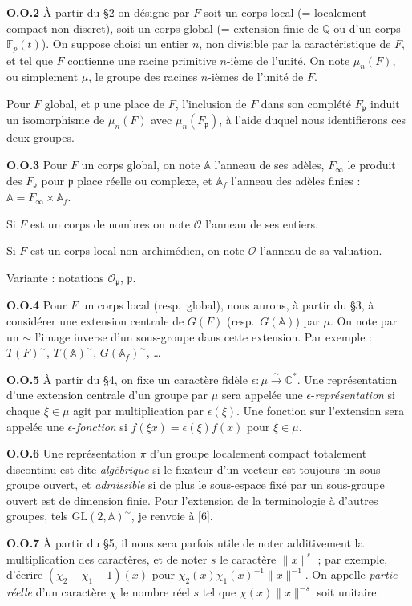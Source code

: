 \documentclass[12pt,a4paper]{article}
\theoremstyle{plain}
\theoremstyle{definition}
\theoremstyle{remark}
\newcommand{\CC}{\mathbb{C}}
\newcommand{\QQ}{\mathbb{Q}}
\newcommand{\Af}{\mathbb{A}}
\newcommand{\FF}{\mathbb{F}}
\newcommand{\cO}{\mathcal{O}}
\newcommand{\frakp}{\mathfrak{p}}
\providecommand{\CC}{\mathbb{C}}
\providecommand{\FF}{\mathbb{F}}
\providecommand{\QQ}{\mathbb{Q}}
\providecommand{\cO}{\mathcal{O}}
\providecommand{\frakp}{\mathfrak{p}}
\begin{document}
\textbf{O.O.2} À partir du \S 2 on désigne par $F$ soit un corps local (= localement compact non discret), soit un corps global (= extension finie de $\QQ$ ou d'un corps $\FF_p(t)$). On suppose choisi un entier $n$, non divisible par la caractéristique de $F$, et tel que $F$ contienne une racine primitive $n$-ième de l'unité. On note $\mu_n(F)$, ou simplement $\mu$, le groupe des racines $n$-ièmes de l'unité de $F$.

Pour $F$ global, et $\frakp$ une place de $F$, l'inclusion de $F$ dans son complété $F_\frakp$ induit un isomorphisme de $\mu_n(F)$ avec $\mu_n(F_\frakp)$, à l'aide duquel nous identifierons ces deux groupes.

\textbf{O.O.3} Pour $F$ un corps global, on note $\Af$ l'anneau de ses adèles, $F_\infty$ le produit des $F_\frakp$ pour $\frakp$ place réelle ou complexe, et $\Af_f$ l'anneau des adèles finies : $\Af = F_\infty \times \Af_f$.

Si $F$ est un corps de nombres on note $\cO$ l'anneau de ses entiers.

Si $F$ est un corps local non archimédien, on note $\cO$ l'anneau de sa valuation.

Variante : notations $\cO_\frakp$, $\frakp$.

\textbf{O.O.4} Pour $F$ un corps local (resp.\ global), nous aurons, à partir du \S 3, à considérer une extension centrale de $G(F)$ (resp.\ $G(\Af)$) par $\mu$. On note par un $\sim$ l'image inverse d'un sous-groupe dans cette extension. Par exemple : $T(F)^\sim$, $T(\Af)^\sim$, $G(\Af_f)^\sim$, \ldots

\textbf{O.O.5} À partir du \S 4, on fixe un caractère fidèle $\epsilon : \mu \xrightarrow{\sim} \CC^*$. Une représentation d'une extension centrale d'un groupe par $\mu$ sera appelée une $\epsilon$-\emph{représentation} si chaque $\xi \in \mu$ agit par multiplication par $\epsilon(\xi)$. Une fonction sur l'extension sera appelée une $\epsilon$-\emph{fonction} si $f(\xi x) = \epsilon(\xi) f(x)$ pour $\xi \in \mu$.

\textbf{O.O.6} Une représentation $\pi$ d'un groupe localement compact totalement discontinu est dite \emph{algébrique} si le fixateur d'un vecteur est toujours un sous-groupe ouvert, et \emph{admissible} si de plus le sous-espace fixé par un sous-groupe ouvert est de dimension finie. Pour l'extension de la terminologie à d'autres groupes, tels $\mathrm{GL}(2, \Af)^\sim$, je renvoie à [6].

\textbf{O.O.7} À partir du \S 5, il nous sera parfois utile de noter additivement la multiplication des caractères, et de noter $s$ le caractère $\|x\|^s$ ; par exemple, d'écrire $(\chi_2 - \chi_1 - 1)(x)$ pour $\chi_2(x) \chi_1(x)^{-1} \|x\|^{-1}$. On appelle \emph{partie réelle} d'un caractère $\chi$ le nombre réel $s$ tel que $\chi(x) \|x\|^{-s}$ soit unitaire.
\end{document}

